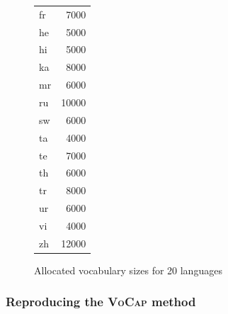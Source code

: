 \begin{figure}[h]
\begin{subtable}{0.32\textwidth}
\begin{tabular}{lr}
            fr & 7000 \\
            he & 5000 \\
            hi & 5000 \\
            ka & 8000 \\
            mr & 6000 \\
            ru & 10000 \\
            sw & 6000 \\
            ta & 4000 \\
            te & 7000 \\
            th & 6000 \\
            tr & 8000 \\
            ur & 6000 \\
            vi & 4000 \\
            zh & 12000 \\
            \bottomrule
        \end{tabular}
        \caption{\citet{zheng_allocating_2021}}
        \label{tab:zheng_allocations}
    \end{subtable}


    \caption{Allocated vocabulary sizes for 20 languages}
    \label{fig:cluster_assignments_k20}
\end{figure}
% 
% 
% 
% 

% 
% 
% 
% 

\subsubsection{Reproducing the \textsc{VoCap} method}
\label{subsec:reproducing_vocap}



